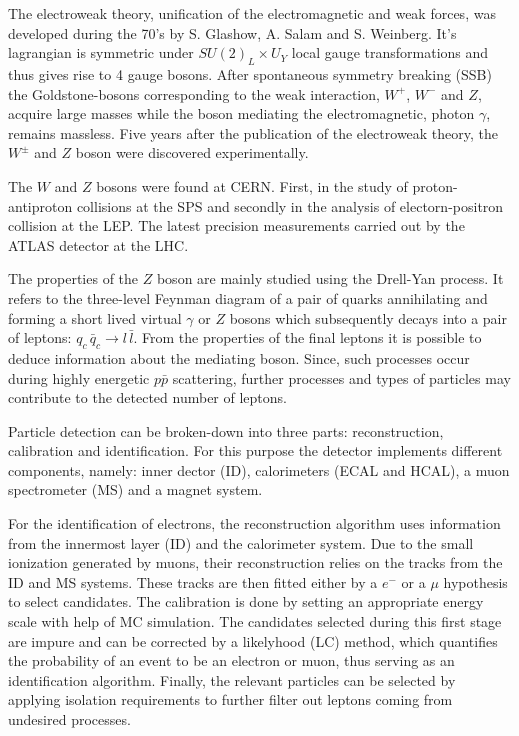\documentclass[11 pt]{article}
\begin{document}
The electroweak theory, unification of the electromagnetic and weak forces, was developed during the 70's by S. Glashow, A. Salam and S. Weinberg. It's lagrangian is symmetric under  $SU(2)_{L}\times U_{Y}$ local gauge transformations and thus gives rise to 4 gauge bosons. After spontaneous symmetry breaking (SSB) the Goldstone-bosons corresponding to the weak interaction, $W^{+}$, $W^{-}$ and $Z$, acquire large masses while the boson mediating the electromagnetic, photon $\gamma$, remains massless. Five years after the publication of the electroweak theory, the $W^\pm$ and $Z$ boson were discovered experimentally.

The $W$ and $Z$ bosons were found at CERN. First, in the study of proton-antiproton collisions at the SPS and secondly in the analysis of electorn-positron collision at the LEP. The latest precision measurements carried out by the ATLAS detector at the LHC. 

The properties of the $Z$ boson are mainly studied using the Drell-Yan process. It refers to the three-level Feynman diagram of a pair of quarks annihilating and forming a short lived virtual $\gamma$ or $Z$ bosons which subsequently decays into a pair of leptons: $q_c\, \bar{q}_c\to l\,\bar{l}$. From the properties of the final leptons it is possible to deduce information about the mediating boson. Since, such processes occur during highly energetic $p\bar{p}$ scattering, further processes and types of particles may contribute to the detected number of leptons.
 
Particle detection can be broken-down into three parts: reconstruction, calibration and identification. For this purpose the detector implements different components, namely: inner dector (ID), calorimeters (ECAL and HCAL), a muon spectrometer (MS) and a magnet system.  

For the identification of electrons, the reconstruction algorithm uses information from the innermost layer (ID) and the calorimeter system. Due to the small ionization generated by muons, their reconstruction relies on the tracks from the ID and MS systems. These tracks are then fitted either by a $e^-$ or a $\mu$ hypothesis to select candidates. The calibration is done by setting an appropriate energy scale with help of MC simulation. The candidates selected during this first stage are impure and can be corrected by a likelyhood (LC) method, which quantifies the probability of an event to be an electron or muon, thus serving as an identification algorithm. Finally, the relevant particles can be selected by applying isolation requirements to further filter out leptons coming from undesired processes. 
\end{document}
